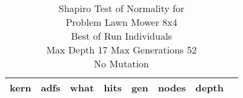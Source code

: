 \begin{table}[H]
\caption{Shapiro Test of Normality for \\ Problem  Lawn Mower 8x4\\Best of Run Individuals \\ Max Depth 17 Max Generations 52\\ No Mutation \\}
\begin{center}
\scalebox{0.8} %
{
\begin{tabular}{lrrrrrrr}
\hline
kern & adfs & what & hits & gen & nodes & depth \\
\hline


\end{tabular}
}
\end{center}
\end{table}

